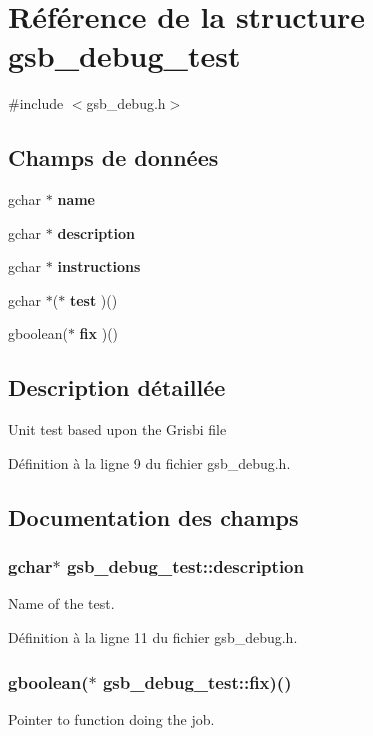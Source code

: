 \section{Référence de la structure gsb\_\-debug\_\-test}
\label{structgsb__debug__test}


{\ttfamily \#include $<$gsb\_\-debug.h$>$}

\subsection*{Champs de données}
\begin{DoxyCompactItemize}
\item 
gchar $\ast$ {\bf name}
\item 
gchar $\ast$ {\bf description}
\item 
gchar $\ast$ {\bf instructions}
\item 
gchar $\ast$($\ast$ {\bf test} )()
\item 
gboolean($\ast$ {\bf fix} )()
\end{DoxyCompactItemize}


\subsection{Description détaillée}
Unit test based upon the Grisbi file 

Définition à la ligne 9 du fichier gsb\_\-debug.h.



\subsection{Documentation des champs}
\subsubsection[{description}]{\setlength{\rightskip}{0pt plus 5cm}gchar$\ast$ {\bf gsb\_\-debug\_\-test::description}}\label{structgsb__debug__test_a29b43f4418a304146dc39d3531330fd4}
Name of the test. 

Définition à la ligne 11 du fichier gsb\_\-debug.h.

\subsubsection[{fix}]{\setlength{\rightskip}{0pt plus 5cm}gboolean($\ast$  {\bf gsb\_\-debug\_\-test::fix})()}\label{structgsb__debug__test_ab93d792e9ec4be45e4e01ea0d8f5fa59}
Pointer to function doing the job. 

